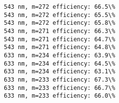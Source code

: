 \documentclass[11pt]{article}
\begin{document}
    \begin{Verbatim}[commandchars=\\\{\}]
543 nm, m=272 efficiency: 66.5\%
543 nm, m=272 efficiency: 65.5\%
543 nm, m=272 efficiency: 65.8\%
543 nm, m=271 efficiency: 66.3\%
543 nm, m=271 efficiency: 64.7\%
543 nm, m=271 efficiency: 64.8\%
633 nm, m=234 efficiency: 63.9\%
633 nm, m=234 efficiency: 64.5\%
633 nm, m=234 efficiency: 63.1\%
633 nm, m=233 efficiency: 67.3\%
633 nm, m=233 efficiency: 66.7\%
633 nm, m=233 efficiency: 66.0\%

    \end{Verbatim}

    \begin{center}
    \end{center}
    { \hspace*{\fill} \\}
    

    
    
    
    
\end{document}
